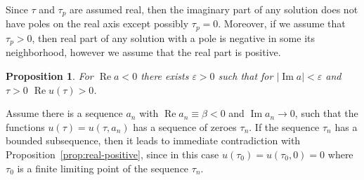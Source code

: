 \documentclass[pdftex]{sigma}
\numberwithin{equation}{section}
\newtheorem{Proposition}[Theorem]{Proposition}
 { \theoremstyle{definition}
\newtheorem{Remark}[Theorem]{Remark} }
\begin{document}
Since $\tau$ and $\tau_p$ are assumed real, then the imaginary part of any solution does not have
poles on the real axis except possibly $\tau_p=0$. Moreover, if we assume that $\tau_p>0$, then real
part of any solution with a pole is negative in some its neighborhood, however we assume that the real part is positive.
\begin{Proposition}\label{prop:positiveness-epsilon}For $\operatorname{Re}a<0$ there exists $\varepsilon>0$ such that for $|\operatorname{Im} a|<\varepsilon$ and $\tau>0$
\mbox{$\operatorname{Re}u(\tau)>0$}.
\end{Proposition}
Assume there is a sequence $a_n$ with $\operatorname{Re}a_n\equiv\beta<0$ and $\operatorname{Im} a_n\to0$, such that
the functions $u(\tau)=u(\tau,a_n)$ has a sequence of zeroes $\tau_n$. If the sequence $\tau_n$ has a bounded
subsequence, then it leads to immediate contradiction with Proposition~\ref{prop:real-positive}, since in this case
$u(\tau_0)=u(\tau_0,0)=0$ where $\tau_0$ is a finite limiting point of the sequence $\tau_n$.
\end{document}
